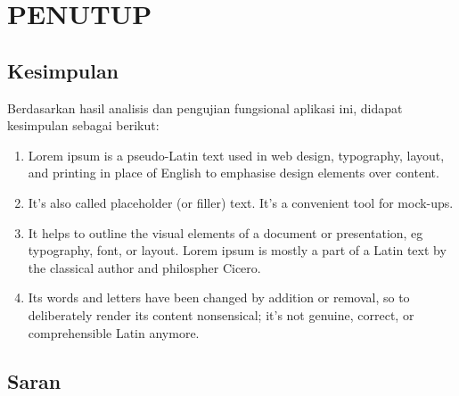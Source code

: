 
\chapter{PENUTUP}

\section{Kesimpulan}
  Berdasarkan hasil analisis dan pengujian fungsional aplikasi ini, didapat kesimpulan sebagai berikut:

  \begin{enumerate}
    \item Lorem ipsum is a pseudo-Latin text used in web design, typography, layout, and printing in place of English to emphasise design elements over content. 
    
    \item It's also called placeholder (or filler) text. It's a convenient tool for mock-ups. 
    
    \item It helps to outline the visual elements of a document or presentation, eg typography, font, or layout. Lorem ipsum is mostly a part of a Latin text by the classical author and philospher Cicero.

    \item Its words and letters have been changed by addition or removal, so to deliberately render its content nonsensical; it's not genuine, correct, or comprehensible Latin anymore. 
  \end{enumerate}

  \section{Saran}
  
\begin{comment}

\end{comment}
